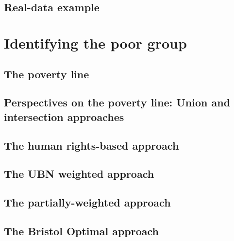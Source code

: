\documentclass[]{book}
\begin{document}
\hypertarget{real-data-example-2}{%
\section{Real-data example}\label{real-data-example-2}}

\hypertarget{identifying-the-poor-group}{%
\chapter{Identifying the poor group}\label{identifying-the-poor-group}}

\hypertarget{the-poverty-line}{%
\section{The poverty line}\label{the-poverty-line}}

\hypertarget{perspectives-on-the-poverty-line-union-and-intersection-approaches}{%
\section{Perspectives on the poverty line: Union and intersection approaches}\label{perspectives-on-the-poverty-line-union-and-intersection-approaches}}

\hypertarget{the-human-rights-based-approach}{%
\section{The human rights-based approach}\label{the-human-rights-based-approach}}

\hypertarget{the-ubn-weighted-approach}{%
\section{The UBN weighted approach}\label{the-ubn-weighted-approach}}

\hypertarget{the-partially-weighted-approach}{%
\section{The partially-weighted approach}\label{the-partially-weighted-approach}}

\hypertarget{the-bristol-optimal-approach}{%
\section{The Bristol Optimal approach}\label{the-bristol-optimal-approach}}
\end{document}
